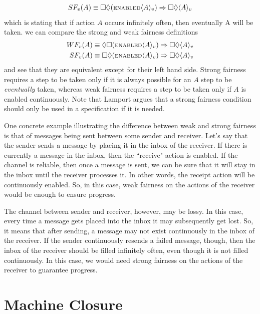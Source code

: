 \documentclass[11pt, oneside]{article}   	%
\begin{document}
\begin{align*}
SF_v(A) \equiv \square \lozenge ( \text{\scriptsize ENABLED} \langle A \rangle _v) \Rightarrow \square \Diamond \langle A \rangle _v
\end{align*}
which is stating that if action $A$ occurs infinitely often, then eventually A will be taken. we can compare the strong and weak fairness definitions
\begin{align*}
WF_v(A) &\equiv 
\Diamond \square (\text{\scriptsize ENABLED} \langle A \rangle _v) \Rightarrow \square \Diamond \langle A \rangle _v \\
SF_v(A) &\equiv \square \lozenge (\text{\scriptsize ENABLED} \langle A \rangle _v ) \Rightarrow \square \Diamond \langle A \rangle _v
\end{align*}
and see that they are equivalent except for their left hand side. Strong fairness requires a step to be taken only if it is always possible for an $A$ step to be \textit{eventually} taken, whereas weak fairness requires a step to be taken only if $A$ is enabled continuously. Note that Lamport argues that a strong fairness condition should only be used in a specification if it is needed.

One concrete example illustrating the difference between weak and strong fairness is that of messages being sent between some sender and receiver. Let's say that the sender sends a message by placing it in the inbox of the receiver. If there is currently a message in the inbox, then the ``receive" action is enabled. If the channel is reliable, then once a message is sent, we can be sure that it will stay in the inbox until the receiver processes it. In other words, the receipt action will be continuously enabled. So, in this case, weak fairness on the actions of the receiver would be enough to ensure progress. 

The channel between sender and receiver, however, may be lossy. In this case, every time a message gets placed into the inbox it may subsequently get lost. So, it means that after sending, a message may not exist continuously in the inbox of the receiver. If the sender continuously resends a failed message, though, then the inbox of the receiver should be filled infinitely often, even though it is not filled continuously. In this case, we would need strong fairness on the actions of the receiver to guarantee progress.


\section*{Machine Closure}
\end{document}
